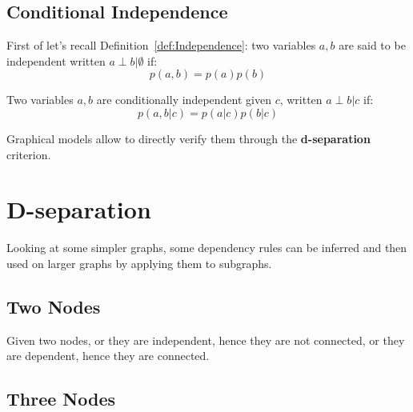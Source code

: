 \subsection{Conditional Independence}
First of let's recall Definition~\ref{def:Independence}: two variables $a,b$ are said to be independent written $a\perp b\vert\emptyset$ if: 
\[
p(a,b)=p(a)p(b)
\]
\begin{definition}
Two variables $a,b$ are conditionally independent given $c$, written $a\perp b\vert c$ if:
\[
p(a,b\vert c)=p(a\vert c)p(b\vert c)
\]
\end{definition}
Graphical models allow to directly verify them through the \textbf{d-separation} criterion.
%
%
%
\section{D-separation}
Looking at some simpler graphs, some dependency rules can be inferred and then used on larger graphs by applying them to subgraphs.
%
%
\subsection{Two Nodes}
Given two nodes, or they are independent, hence they are not connected, or they are dependent, hence they are connected.
%
%
\subsection{Three Nodes}
%
